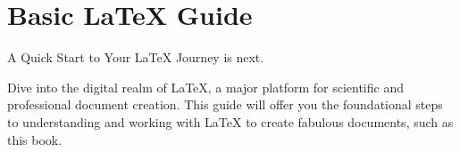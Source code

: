 \documentclass[a4paper,12pt]{book}
\begin{document}
\chapter{Basic LaTeX Guide}
A Quick Start to Your LaTeX Journey is next.

Dive into the digital realm of LaTeX, a major platform for scientific and professional document creation. This guide will offer you the foundational steps to understanding and working with LaTeX to create fabulous documents, such as this book.



\printindex
\end{document}
